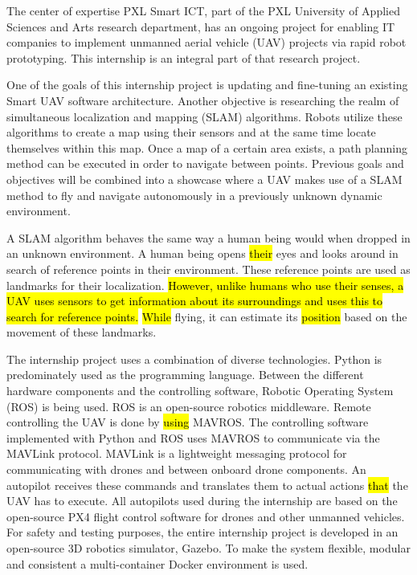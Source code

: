 The center of expertise PXL Smart ICT, part of the PXL University of Applied Sciences and Arts research department, has an ongoing project for enabling IT companies to implement unmanned aerial vehicle (UAV) projects via rapid robot prototyping. This internship is an integral part of that research project.

One of the goals of this internship project is updating and fine\hyp{}tuning an existing Smart UAV software architecture. Another objective is researching the realm of simultaneous localization and mapping (SLAM) algorithms. Robots utilize these algorithms to create a map using their sensors and at the same time locate themselves within this map. Once a map of a certain area exists, a path planning method can be executed in order to navigate between points. Previous goals and objectives will be combined into a showcase where a UAV makes use of a SLAM method to fly and navigate autonomously in a previously unknown dynamic environment.

A SLAM algorithm behaves the same way a human being would when dropped in an unknown environment. A human being opens \hl{their} eyes and looks around in search of reference points in their environment. These reference points are used as landmarks for their localization. \hl{However, unlike humans who use their senses, a UAV uses sensors to get information about its surroundings and uses this to search for reference points.} \hl{While} flying, it can estimate its \hl{position} based on the movement of these landmarks.

The internship project uses a combination of diverse technologies. Python is predominately used as the programming language. Between the different hardware components and the controlling software, Robotic Operating System (ROS) is being used. ROS is an open\hyp{}source robotics middleware. Remote controlling the UAV is done by \hl{using} MAVROS. The controlling software implemented with Python and ROS uses MAVROS to communicate via the MAVLink protocol. MAVLink is a lightweight messaging protocol for communicating with drones and between onboard drone components. An autopilot receives these commands and translates them to actual actions \hl{that} the UAV has to execute. All autopilots used during the internship are based on the open\hyp{}source PX4 flight control software for drones and other unmanned vehicles. For safety and testing purposes, the entire internship project is developed in an open\hyp{}source 3D robotics simulator, Gazebo. To make the system flexible, modular and consistent a multi\hyp{}container Docker environment is used.

